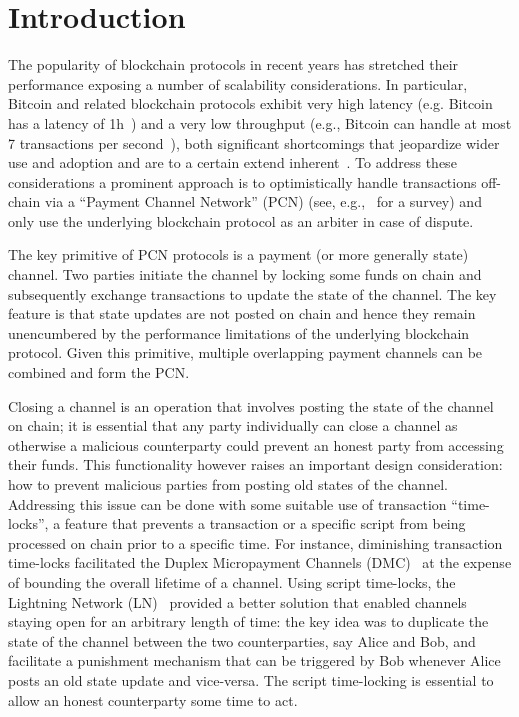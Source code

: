 \section{Introduction}
  The popularity of blockchain protocols 
  in recent years has stretched their
  performance  exposing a number of scalability considerations. 
In particular, 
Bitcoin and related blockchain protocols exhibit very high
  latency (e.g. Bitcoin has a latency of 1h~\cite{bitcoin}) 
  and a very low throughput (e.g., Bitcoin can handle at most 7
  transactions per second~\cite{scaling}), 
both significant shortcomings that jeopardize wider 
use and adoption and are to a certain extend inherent~\cite{scaling}. 
To address these considerations
a prominent approach is to optimistically handle
  transactions off-chain via a ``Payment Channel Network'' 
  (PCN) (see, e.g.,~\cite{DBLP:conf/fc/GudgeonMRMG20} for a survey)
  and only use the underlying blockchain protocol as an
  arbiter in case of dispute.

The key primitive of PCN protocols is a 
payment (or more generally state) channel. 
Two parties initiate the channel by locking
some funds on chain and subsequently
exchange transactions to update the state of the channel. 
The key feature is that state updates are not posted on chain
and hence they remain unencumbered by the performance limitations
of the underlying blockchain protocol. 
Given this primitive, multiple overlapping payment
channels can be combined and form the PCN. 

Closing a channel is an operation that involves posting the 
state of the channel on chain; it is essential that any party
individually can close a channel as otherwise a malicious counterparty
could prevent an honest party  from
accessing their funds. This functionality
however raises an important design consideration: how to prevent malicious parties from posting old states of the channel.
%
Addressing this issue can be done with some suitable use
of  transaction ``time-locks'', a feature that prevents a transaction
or a specific script from being processed on chain
prior to a specific time. 
%
For instance, diminishing transaction time-locks 
facilitated the Duplex Micropayment Channels (DMC)~\cite{decker}
at the expense of bounding the overall lifetime of a channel. 
Using script time-locks, the Lightning Network (LN)~\cite{lightning}
provided a better solution that enabled channels staying open
for an arbitrary length of time: the key idea was to duplicate the
state of the channel between the two counterparties, say Alice and Bob, and facilitate a punishment mechanism that can be triggered by Bob whenever Alice posts an old state update and vice-versa. The script time-locking is essential to allow an honest counterparty some time to act. 

